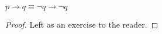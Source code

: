 \guard




\begin{prop}
\label{prop:contrapositiveEquivalence}
  $p\rightarrow q \equiv \neg q\rightarrow \neg q$
\end{prop}
\begin{proof}
  Left as an exercise to the reader.
\end{proof}
